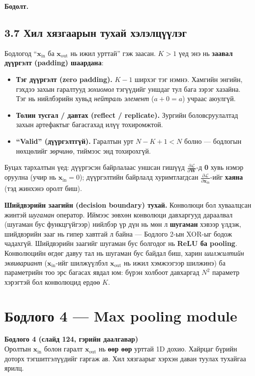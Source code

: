 \documentclass[11pt]{article}
\newenvironment{problem}[2][Бодлого]
    { \begin{mdframed}[backgroundcolor=gray!20] \textbf{#1 #2} \\}
    { \end{mdframed}}
\newenvironment{solution}[1][\textbf{Бодолт.}]
    { \noindent #1 \smallskip \\ }
    { \medskip }
\newcommand{\xin}{\mathbf{x}_{\mathrm{in}}}
\newcommand{\xout}{\mathbf{x}_{\mathrm{out}}}
\newcommand{\dL}[1]{\frac{\partial \mathcal{L}}{\partial #1}}
\begin{document}
\begin{solution}
\subsection*{3.7 Хил хязгаарын тухай хэлэлцүүлэг}
Бодлогод ``$\xin$ ба $\xout$ нь ижил урттай'' гэж заасан. $K > 1$ үед энэ нь
\textbf{заавал дүүргэлт (padding) шаардана}:
\begin{itemize}[leftmargin=*]
  \item \textbf{Тэг дүүргэлт (zero padding).} $K-1$ ширхэг тэг нэмнэ. Хамгийн энгийн,
        гэхдээ захын гаралтууд \emph{зохиомол} тэгүүдийг уншдаг тул бага зэрэг хазайна.
        Тэг нь нийлбэрийн хувьд \emph{нейтраль элемент} ($a+0=a$) учраас аюулгүй.
  \item \textbf{Толин тусгал / давтах (reflect / replicate).} Зургийн боловсруулалтад
        захын артефактыг багасгахад илүү тохиромжтой.
  \item \textbf{``Valid'' (дүүргэлтгүй).} Гаралтын урт $N-K+1 < N$ болно —
        бодлогын нөхцөлийг \emph{зөрчинө}, тиймээс энд тохирохгүй.
\end{itemize}
Буцах тархалтын үед: дүүргэсэн байрлалаас уншсан гишүүд $\dL{\mathbf{W}}$-д \textbf{0}
хувь нэмэр оруулна (учир нь $\xin = 0$); дүүргэлтийн байрлалд хуримтлагдсан
$\dL{\xin}$-ийг \textbf{хаяна} (тэд жинхэнэ оролт биш).

\medskip
\textbf{Шийдвэрийн заагийн (decision boundary) тухай.} Конволюци бол хуваалцсан жинтэй
\emph{шугаман} оператор. Иймээс зөвхөн конволюци давхаргууд дараалвал (шугаман бус
функцгүйгээр) нийлбэр үр дүн нь мөн л \textbf{шугаман} хэвээр үлдэж, шийдвэрийн зааг нь
гипер хавтгай л байна — Бодлого 2-ын XOR-ыг бодож чадахгүй. Шийдвэрийн заагийг
шугаман бус болгодог нь \textbf{ReLU ба pooling}. Конволюцийн өгдөг давуу тал нь
шугаман бус байдал биш, харин \emph{шилжилтийн эквивариант} ($\xin$-ийг шилжүүлбэл
$\xout$ нь ижил хэмжээгээр шилжинэ) ба параметрийн тоо эрс багасах явдал юм:
бүрэн холбоот давхаргад $N^2$ параметр хэрэгтэй бол конволюцид ердөө $K$.
\end{solution}

\section{Бодлого 4 — Max pooling module}

\begin{problem}{4 (слайд 124, гэрийн даалгавар)}
Оролтын $\xin$ болон гаралт $\xout$ нь \textbf{өөр өөр} урттай 1D дохио.
Хайрцаг бүрийн доторх тэгшитгэлүүдийг гаргаж ав.
Хил хязгаарыг хэрхэн даван туулах тухайгаа ярилц.
\end{problem}
\end{document}
